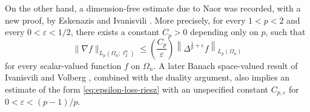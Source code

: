 \documentclass{amsart}
\numberwithin{equation}{section}
\theoremstyle{definition}
\theoremstyle{remark}
\newcommand{\1}{\mathbf 1}
\begin{document}
On the other hand, a dimension-free estimate due to Naor was recorded, with a new proof, by Eskenazis and Ivanisvili \cite[Proposition 43]{E-I2020}.  More precisely, for every
$1<p<2$ and every $0<\varepsilon<1/2$, there exists a constant $C_{p}>0$ depending only on $p$, such that
\begin{equation}\label{eq:epsilon-loss-riesz}
 \|\nabla f\|_{L_{p}(\Omega_{n};\ell_{2}^{n})}
 \leq\left(\frac{C_{p}}{\varepsilon}\right)\left\|\Delta^{\frac{1}{p}+\varepsilon}f\right\|_{L_{p}(\Omega_{n})}
\end{equation}
for every scalar-valued function $f$ on $\Omega_{n}$. A later Banach space-valued result of Ivanisvili and Volberg \cite[Theorem 4.1]{I-V2022}, combined with the duality argument, also implies an estimate of the form \eqref{eq:epsilon-loss-riesz} with an unspecified constant $C_{p,\varepsilon}$ for $0<\varepsilon<(p-1)/p$. 
%
%
\end{document}
